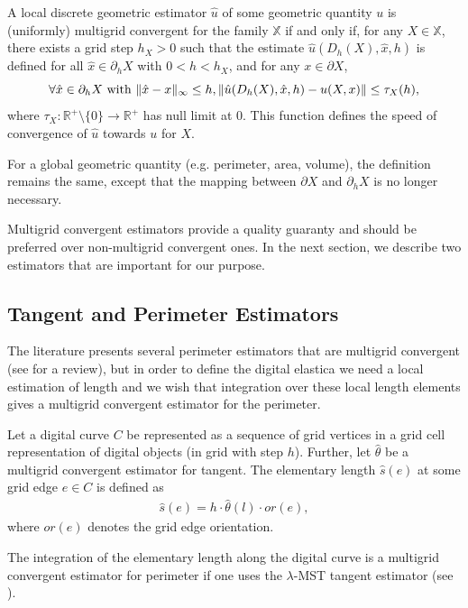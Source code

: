 \documentclass[runningheads]{llncs}
\DeclarePairedDelimiter\norm{\lVert}{\rVert}%
\begin{document}
\begin{definition}
  A local discrete geometric estimator $\hat{u}$ of some geometric
  quantity $u$ is (uniformly) multigrid convergent for the family $\mathbb{X}$ if
  and only if, for any $X \in \mathbb{X}$, there exists a grid step
  $h_X>0$ such that the estimate $\hat{u}(D_h(X),\hat{x},h)$ is
  defined for all $\hat{x} \in \partial_hX$ with $ 0 < h < h_X$, and
  for any $x \in \partial X$,
  \begin{equation*}
    \forall \hat{x} \in  \partial_hX \text{ with } \norm{ \hat{x} - x }_{\infty} \leq h, \norm{ \hat{u}(D_h(X),\hat{x},h) - u(X,x)} \leq \tau_{X}(h),			
  \end{equation*}
  where $\tau_{X}:\mathbb{R}^{+}\setminus\{0\} \rightarrow
  \mathbb{R}^{+}$ has null limit at $0$. This function defines the
  speed of convergence of $\hat{u}$ towards $u$ for $X$.
\end{definition}
	
For a global geometric quantity (e.g. perimeter, area, volume), the definition remains the same, except that the mapping
between $\partial X$ and $\partial_h X$ is no longer necessary.
	
Multigrid convergent estimators provide a quality guaranty and should be preferred over non-multigrid convergent
ones. In the next section, we describe two estimators that are important for our purpose.

\subsection{Tangent and Perimeter Estimators}

The literature presents several perimeter estimators that are multigrid convergent (see
\cite{coeurjolly04comparative,coeurjolly12multigrid} for a review), but in order to define the digital elastica we need a local estimation
of length and we wish that integration over these local length elements gives a multigrid convergent estimator for the
perimeter.

\begin{definition}
  Let a digital curve $C$ be represented as a sequence of grid vertices in a grid cell representation of digital objects (in grid with step $h$). Further, let $\hat{\theta}$ be a multigrid convergent estimator for tangent. The elementary length $\hat{s}(e)$ at some grid edge $e\in C$ is defined as
  \begin{align*}
    \hat{s}(e) = h \cdot \hat{\theta}(l) \cdot or(e),
  \end{align*}
  where $or(e)$ denotes the grid edge orientation.
\end{definition}
The integration of the elementary length along the digital curve is a multigrid convergent estimator for perimeter if
one uses the $\lambda$-MST \cite{lachaud07tangent} tangent estimator (see \cite{lachaud06hdr}).
\end{document}
